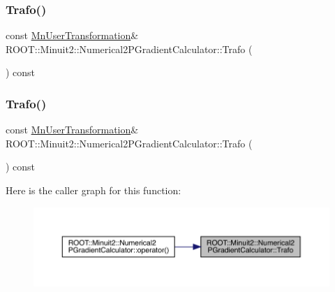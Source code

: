 \subsubsection{\texorpdfstring{Trafo()}{Trafo()}\hspace{0.1cm}{\footnotesize\ttfamily [1/3]}}
{\footnotesize\ttfamily const \mbox{\hyperlink{classROOT_1_1Minuit2_1_1MnUserTransformation}{Mn\+User\+Transformation}}\& R\+O\+O\+T\+::\+Minuit2\+::\+Numerical2\+P\+Gradient\+Calculator\+::\+Trafo (\begin{DoxyParamCaption}{ }\end{DoxyParamCaption}) const\hspace{0.3cm}{\ttfamily [inline]}}

\mbox{\label{classROOT_1_1Minuit2_1_1Numerical2PGradientCalculator_a5a0bce9f2c00da4aae9a2b6d3b706010}} 
\subsubsection{\texorpdfstring{Trafo()}{Trafo()}\hspace{0.1cm}{\footnotesize\ttfamily [2/3]}}
{\footnotesize\ttfamily const \mbox{\hyperlink{classROOT_1_1Minuit2_1_1MnUserTransformation}{Mn\+User\+Transformation}}\& R\+O\+O\+T\+::\+Minuit2\+::\+Numerical2\+P\+Gradient\+Calculator\+::\+Trafo (\begin{DoxyParamCaption}{ }\end{DoxyParamCaption}) const\hspace{0.3cm}{\ttfamily [inline]}}

Here is the caller graph for this function\+:
\nopagebreak
\begin{figure}[H]
\begin{center}
\leavevmode
\includegraphics[width=350pt]{d0/d82/classROOT_1_1Minuit2_1_1Numerical2PGradientCalculator_a5a0bce9f2c00da4aae9a2b6d3b706010_icgraph}
\end{center}
\end{figure}
\mbox{\label{classROOT_1_1Minuit2_1_1Numerical2PGradientCalculator_a5a0bce9f2c00da4aae9a2b6d3b706010}} 

